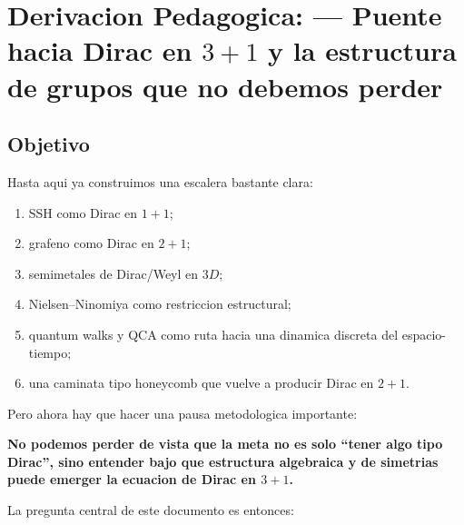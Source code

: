\chapter{Derivacion Pedagogica: --- Puente hacia Dirac en \(3+1\) y la estructura de grupos que no debemos perder}
\label{ch:puente-dirac-3p1-grupos}







\section{Objetivo}

Hasta aqui ya construimos una escalera bastante clara:

\begin{enumerate}[leftmargin=*]
  \item SSH como Dirac en \(1+1\);
  \item grafeno como Dirac en \(2+1\);
  \item semimetales de Dirac/Weyl en \(3D\);
  \item Nielsen--Ninomiya como restriccion estructural;
  \item quantum walks y QCA como ruta hacia una dinamica discreta del espacio-tiempo;
  \item una caminata tipo honeycomb que vuelve a producir Dirac en \(2+1\).
\end{enumerate}

Pero ahora hay que hacer una pausa metodologica importante:

\begin{displayquote}
\textbf{No podemos perder de vista que la meta no es solo \enquote{tener algo tipo Dirac}, sino entender bajo que estructura algebraica y de simetrias puede emerger la ecuacion de Dirac en \(3+1\).}
\end{displayquote}

La pregunta central de este documento es entonces:

